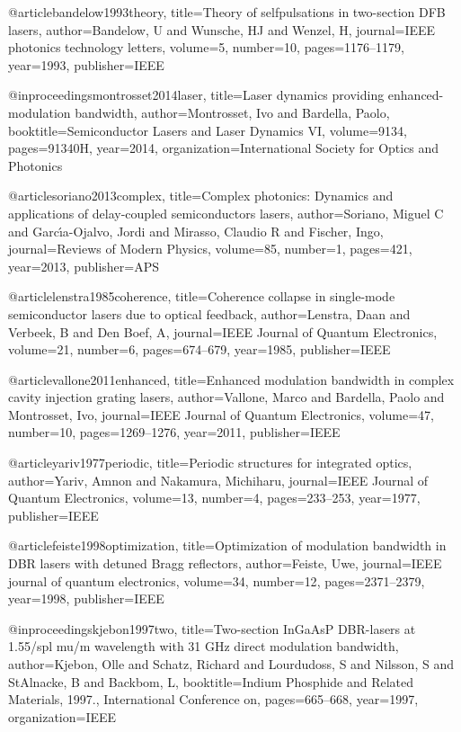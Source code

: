@article{bandelow1993theory,
  title={Theory of selfpulsations in two-section DFB lasers},
  author={Bandelow, U and Wunsche, HJ and Wenzel, H},
  journal={IEEE photonics technology letters},
  volume={5},
  number={10},
  pages={1176--1179},
  year={1993},
  publisher={IEEE}
}

@inproceedings{montrosset2014laser,
  title={Laser dynamics providing enhanced-modulation bandwidth},
  author={Montrosset, Ivo and Bardella, Paolo},
  booktitle={Semiconductor Lasers and Laser Dynamics VI},
  volume={9134},
  pages={91340H},
  year={2014},
  organization={International Society for Optics and Photonics}
}

@article{soriano2013complex,
  title={Complex photonics: Dynamics and applications of delay-coupled semiconductors lasers},
  author={Soriano, Miguel C and Garc{\'\i}a-Ojalvo, Jordi and Mirasso, Claudio R and Fischer, Ingo},
  journal={Reviews of Modern Physics},
  volume={85},
  number={1},
  pages={421},
  year={2013},
  publisher={APS}
}

@article{lenstra1985coherence,
  title={Coherence collapse in single-mode semiconductor lasers due to optical feedback},
  author={Lenstra, Daan and Verbeek, B and Den Boef, A},
  journal={IEEE Journal of Quantum Electronics},
  volume={21},
  number={6},
  pages={674--679},
  year={1985},
  publisher={IEEE}
}

@article{vallone2011enhanced,
  title={Enhanced modulation bandwidth in complex cavity injection grating lasers},
  author={Vallone, Marco and Bardella, Paolo and Montrosset, Ivo},
  journal={IEEE Journal of Quantum Electronics},
  volume={47},
  number={10},
  pages={1269--1276},
  year={2011},
  publisher={IEEE}
}

@article{yariv1977periodic,
  title={Periodic structures for integrated optics},
  author={Yariv, Amnon and Nakamura, Michiharu},
  journal={IEEE Journal of Quantum Electronics},
  volume={13},
  number={4},
  pages={233--253},
  year={1977},
  publisher={IEEE}
}

@article{feiste1998optimization,
  title={Optimization of modulation bandwidth in DBR lasers with detuned Bragg reflectors},
  author={Feiste, Uwe},
  journal={IEEE journal of quantum electronics},
  volume={34},
  number={12},
  pages={2371--2379},
  year={1998},
  publisher={IEEE}
}

@inproceedings{kjebon1997two,
  title={Two-section InGaAsP DBR-lasers at 1.55/spl mu/m wavelength with 31 GHz direct modulation bandwidth},
  author={Kjebon, Olle and Schatz, Richard and Lourdudoss, S and Nilsson, S and StAlnacke, B and Backbom, L},
  booktitle={Indium Phosphide and Related Materials, 1997., International Conference on},
  pages={665--668},
  year={1997},
  organization={IEEE}
}

